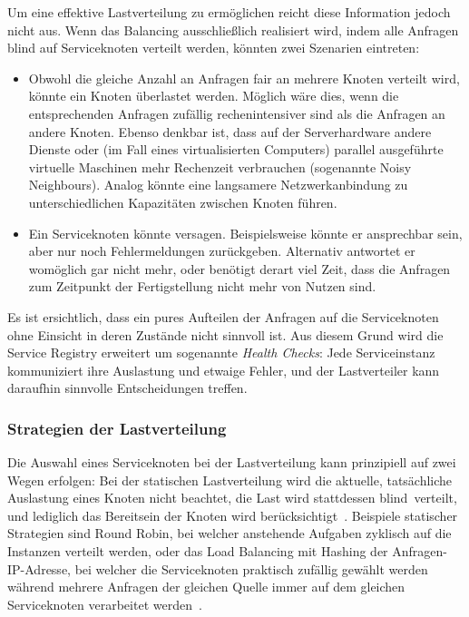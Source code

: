 Um eine effektive Lastverteilung zu ermöglichen reicht diese Information jedoch nicht aus.
Wenn das Balancing ausschließlich realisiert wird, indem alle Anfragen \glq blind\grq{} auf Serviceknoten verteilt werden,
könnten zwei Szenarien eintreten:
\begin{itemize}
	\item Obwohl die gleiche Anzahl an Anfragen fair an mehrere Knoten verteilt wird, könnte ein Knoten überlastet werden.
    Möglich wäre dies, wenn die entsprechenden Anfragen zufällig rechenintensiver sind als die Anfragen an andere Knoten.
    Ebenso denkbar ist, dass auf der Serverhardware andere Dienste oder (im Fall eines virtualisierten Computers) parallel
    ausgeführte virtuelle Maschinen mehr Rechenzeit verbrauchen (sogenannte \glqq Noisy Neighbours\grqq{}).
    Analog könnte eine langsamere Netzwerkanbindung zu unterschiedlichen Kapazitäten zwischen Knoten führen.
	\item Ein Serviceknoten könnte versagen.
    Beispielsweise könnte er ansprechbar sein, aber nur noch Fehlermeldungen zurückgeben.
    Alternativ antwortet er womöglich gar nicht mehr, oder benötigt derart viel Zeit, dass die Anfragen zum Zeitpunkt
    der Fertigstellung nicht mehr von Nutzen sind.
\end{itemize}

Es ist ersichtlich, dass ein pures Aufteilen der Anfragen auf die Serviceknoten ohne Einsicht in deren Zustände nicht sinnvoll ist.
Aus diesem Grund wird die Service Registry erweitert um sogenannte \textit{Health Checks}:
Jede Serviceinstanz kommuniziert ihre Auslastung und etwaige Fehler, und der Lastverteiler kann daraufhin sinnvolle Entscheidungen treffen.

\subsubsection{Strategien der Lastverteilung}\label{sec:loadbalancing-strats}
Die Auswahl eines Serviceknoten bei der Lastverteilung kann prinzipiell auf zwei Wegen erfolgen:
Bei der statischen Lastverteilung wird die aktuelle, tatsächliche Auslastung eines Knoten nicht beachtet, die Last wird stattdessen
\glq blind\grq\ verteilt, und lediglich das Bereitsein der Knoten wird berücksichtigt~\cite{mishra.2020}.
Beispiele statischer Strategien sind Round Robin, bei welcher anstehende Aufgaben zyklisch auf die Instanzen verteilt werden,
oder das Load Balancing mit Hashing der Anfragen-IP-Adresse,
bei welcher die Serviceknoten praktisch zufällig gewählt werden während mehrere Anfragen der gleichen Quelle immer auf
dem gleichen Serviceknoten verarbeitet werden~\cite{g4g-loadbalancing}.

